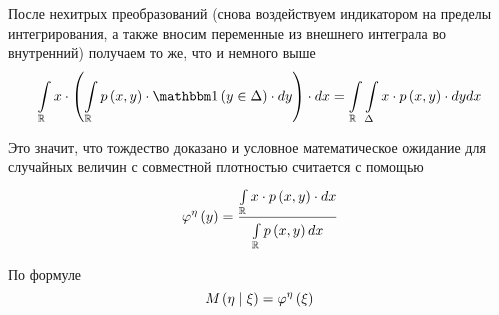 После нехитрых преобразований
(снова воздействуем индикатором на пределы интегрирования,
а также вносим переменные из внешнего интеграла во внутренний)
получаем то же, что и немного выше
$$\integral{\mathbb{R}}{}{x}{
        x \cdot \left(
            \integral{\mathbb{R}}{}{y}{
                \pdf{x,y} \cdot \indicator{y \in \Delta} \cdot} \right)
            \cdot}
        = \integral{\mathbb{R}}{}{x}{\integral{\Delta}{}{y}{
        x \cdot \pdf{x,y} \cdot}}$$

Это значит, что тождество доказано и условное математическое ожидание
для случайных величин с совместной плотностью считается с помощью
$$\varphi^{\eta}\left( y \right)
    = \frac{\integral{\mathbb{R}}{}{x}{x \cdot \pdf{x,y} \cdot}}
                {\integral{\mathbb{R}}{}{x}{\pdf{x,y}}}$$

По формуле
$$\mean{\left( \eta \mid \xi \right)} = \varphi^{\eta}\left( \xi \right)$$
